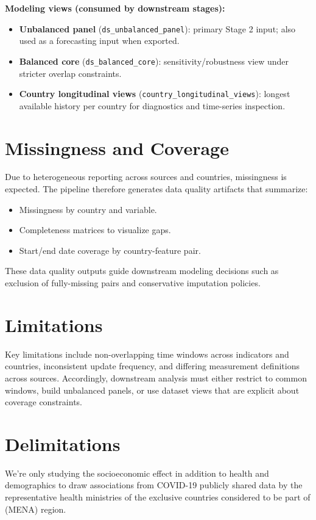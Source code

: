 \documentclass[a4paper]{report}
\begin{document}
\textbf{Modeling views (consumed by downstream stages):}
\begin{itemize}
    \item \textbf{Unbalanced panel} (\texttt{ds\_unbalanced\_panel}): primary Stage 2 input; also used as a forecasting input when exported.
    \item \textbf{Balanced core} (\texttt{ds\_balanced\_core}): sensitivity/robustness view under stricter overlap constraints.
    \item \textbf{Country longitudinal views} (\texttt{country\_longitudinal\_views}): longest available history per country for diagnostics and time-series inspection.
\end{itemize}

\section{Missingness and Coverage}
Due to heterogeneous reporting across sources and countries, missingness is expected.
The pipeline therefore generates data quality artifacts that summarize:
\begin{itemize}
    \item Missingness by country and variable.
    \item Completeness matrices to visualize gaps.
    \item Start/end date coverage by country-feature pair.
\end{itemize}
These data quality outputs guide downstream modeling decisions such as exclusion of fully-missing pairs and conservative imputation policies.

\section{Limitations}
Key limitations include non-overlapping time windows across indicators and countries, inconsistent update frequency, and differing measurement definitions across sources.
Accordingly, downstream analysis must either restrict to common windows, build unbalanced panels, or use dataset views that are explicit about coverage constraints.

\section{Delimitations}
We're only studying the socioeconomic effect in addition to health and demographics to draw associations from COVID-19 publicly shared data by the representative health ministries of the exclusive countries considered to be part of (MENA) region.
\end{document}
